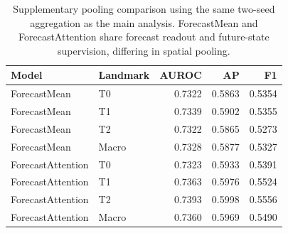 \begin{table}[t]
\centering
\small
\caption{Supplementary pooling comparison using the same two-seed aggregation as the main analysis. ForecastMean and ForecastAttention share forecast readout and future-state supervision, differing in spatial pooling.}
\label{tab:pooling}
\begin{tabular}{llrrr}
\toprule
Model & Landmark & AUROC & AP & F1 \\
\midrule
ForecastMean & T0 & 0.7322 & 0.5863 & 0.5354 \\
ForecastMean & T1 & 0.7339 & 0.5902 & 0.5355 \\
ForecastMean & T2 & 0.7322 & 0.5865 & 0.5273 \\
ForecastMean & Macro & 0.7328 & 0.5877 & 0.5327 \\
ForecastAttention & T0 & 0.7323 & 0.5933 & 0.5391 \\
ForecastAttention & T1 & 0.7363 & 0.5976 & 0.5524 \\
ForecastAttention & T2 & 0.7393 & 0.5998 & 0.5556 \\
ForecastAttention & Macro & 0.7360 & 0.5969 & 0.5490 \\
\bottomrule
\end{tabular}
\end{table}
